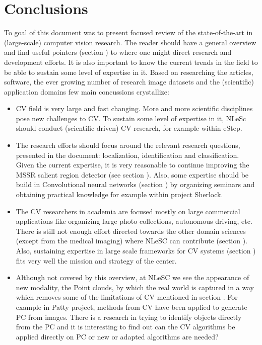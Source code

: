\section{Conclusions}
\label{sec:conc}

To goal of this document was to present focused review of the state-of-the-art in (large-scale) computer vision research. The reader should have a general overview and find useful pointers (section \underline{}) to where one might direct research and development efforts. It is also important to know the current trends in the field to be able to sustain some level of expertise in it. Based on researching the articles, software, the ever growing number of research image datasets and the (scientific) application domains few main concussions crystallize:

\begin{itemize}
\item{CV field is very large and fast changing. More and more scientific disciplines pose new challenges to CV. To sustain some level of expertise in it, NLeSc should conduct (scientific-driven) CV research, for example within eStep.}
\item{The research efforts should focus around the relevant research questions, presented in the document: localization, identification and classification. Given the current expertise, it is very reasonable to continue improving the MSSR salient region detector (see section \underline{}). Also, some expertise should be build in Convolutional neural networks (section \underline{}) by organizing seminars and obtaining practical knowledge for example within project Sherlock.}
\item{The CV researchers in academia are focused mostly on large commercial applications like organizing large photo collections, autonomous driving, etc. There is still not enough effort directed towards the other domain sciences (except from the medical imaging) where NLeSC can contribute (section \underline{}). Also, sustaining expertise in large scale frameworks for CV systems (section \underline{}) fits very well the mission and strategy of the center.}
\item{Although not covered by this overview, at NLeSC we see the appearance of new modality, the Point clouds, by which the real world is captured in a way which removes some of the limitations of CV mentioned in section . For example in Patty project, methods from CV have been applied to generate PC from images. There is a research in trying to identify objects directly from the PC and it is interesting to find out can the CV algorithms be applied directly on PC or new or adapted algorithms are needed?}

\end{itemize}

